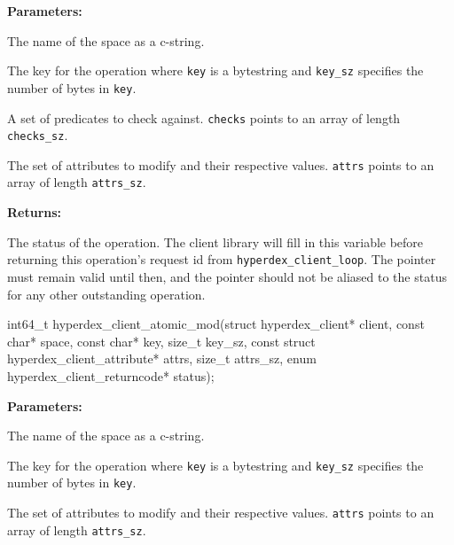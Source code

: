 \noindent\textbf{Parameters:}
\begin{description}[labelindent=\widthof{{\texttt{checks}, \texttt{checks\_sz}}},leftmargin=*,noitemsep,nolistsep,align=right]
\item[\texttt{space}] The name of the space as a c-string.
\item[\texttt{key}, \texttt{key\_sz}] The key for the operation where \texttt{key} is a bytestring and \texttt{key\_sz} specifies the number of bytes in \texttt{key}.
\item[\texttt{checks}, \texttt{checks\_sz}] A set of predicates to check against.  \texttt{checks} points to an array of length \texttt{checks\_sz}.
\item[\texttt{attrs}, \texttt{attrs\_sz}] The set of attributes to modify and their respective values.  \texttt{attrs} points to an array of length \texttt{attrs\_sz}.
\end{description}

\noindent\textbf{Returns:}
\begin{description}[labelindent=\widthof{{\texttt{status}}},leftmargin=*,noitemsep,nolistsep,align=right]
\item[\texttt{status}] The status of the operation.  The client library will fill in this variable before returning this operation's request id from \texttt{hyperdex\_client\_loop}.  The pointer must remain valid until then, and the pointer should not be aliased to the status for any other outstanding operation.
\end{description}

\funcsep
\begin{ccode}
int64_t hyperdex_client_atomic_mod(struct hyperdex_client* client,
                const char* space,
                const char* key, size_t key_sz,
                const struct hyperdex_client_attribute* attrs, size_t attrs_sz,
                enum hyperdex_client_returncode* status);
\end{ccode}
\funcdesc 

\noindent\textbf{Parameters:}
\begin{description}[labelindent=\widthof{{\texttt{attrs}, \texttt{attrs\_sz}}},leftmargin=*,noitemsep,nolistsep,align=right]
\item[\texttt{space}] The name of the space as a c-string.
\item[\texttt{key}, \texttt{key\_sz}] The key for the operation where \texttt{key} is a bytestring and \texttt{key\_sz} specifies the number of bytes in \texttt{key}.
\item[\texttt{attrs}, \texttt{attrs\_sz}] The set of attributes to modify and their respective values.  \texttt{attrs} points to an array of length \texttt{attrs\_sz}.
\end{description}

